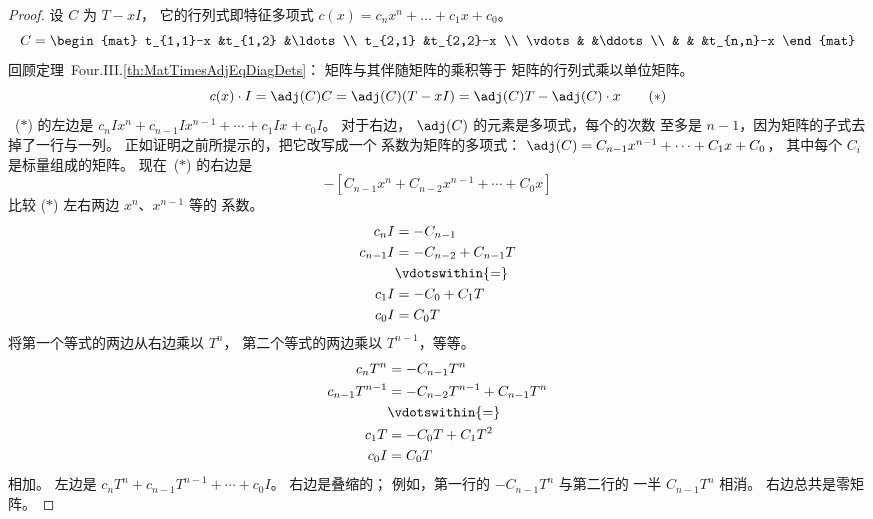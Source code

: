 \begin{proof}
设 \( C \) 为 \( T-xI \)，
它的行列式即特征多项式
\( c(x)=c_nx^n+\dots+c_1x+c_0 \)。
\begin{equation*}
  C=\begin{mat}
    t_{1,1}-x        &t_{1,2}   &\ldots        \\
    t_{2,1}          &t_{2,2}-x               \\
    \vdots           &          &\ddots       \\
                     &          &       &t_{n,n}-x
  \end{mat}
\end{equation*}
回顾定理~Four.III.\ref{th:MatTimesAdjEqDiagDets}：
矩阵与其伴随矩阵的乘积等于
矩阵的行列式乘以单位矩阵。
\begin{equation*}
  c(x)\cdot I
  =\adj (C)C
  =\adj (C)(T-xI)
  =\adj (C)T- \adj(C)\cdot x
\tag*{($*$)}
\end{equation*}
~($*$) 的左边是
$c_nIx^n+c_{n-1}Ix^{n-1}+\cdots+c_1Ix+c_0I$。
对于右边，
\( \adj (C) \) 的元素是多项式，每个的次数
至多是 \( n-1 \)，因为矩阵的子式去掉了一行与一列。
正如证明之前所提示的，把它改写成一个
系数为矩阵的多项式：
\( \adj (C)=C_{n-1}x^{n-1}+\cdots+C_1x+C_0 \)，
其中每个 \( C_i \) 是标量组成的矩阵。
现在~($*$) 的右边是
\begin{equation*}
  [(C_{n-1}T)x^{n-1}+\cdots+(C_1T)x+C_0T]  
   -[C_{n-1}x^n+C_{n-2}x^{n-1}+\cdots+C_0x]
\end{equation*}
比较 ($*$) 左右两边
\( x^n \)、$x^{n-1}$ 等的
系数。
\begin{align*}
  c_nI
  &=-C_{n-1}    \\
  c_{n-1}I
  &=-C_{n-2}+C_{n-1}T    \\
  &\vdotswithin{=}             \\
  c_{1}I
  &=-C_{0}+C_{1}T    \\
  c_{0}I
  &=C_{0}T
\end{align*}
将第一个等式的两边从右边乘以 \( T^n \)，
第二个等式的两边乘以 \( T^{n-1} \)，等等。
\begin{align*}
  c_nT^n
  &=-C_{n-1}T^n    \\
  c_{n-1}T^{n-1}
  &=-C_{n-2}T^{n-1}+C_{n-1}T^n    \\
  &\vdotswithin{=}             \\
  c_{1}T
  &=-C_{0}T+C_{1}T^2    \\
  c_{0}I
  &=C_{0}T
\end{align*}
相加。
左边是
\( c_nT^n+c_{n-1}T^{n-1}+\cdots+c_0I \)。
右边是叠缩的；
例如，第一行的 $-C_{n-1}T^n$ 与第二行的
一半 $C_{n-1}T^n$ 相消。
右边总共是零矩阵。
\end{proof}

